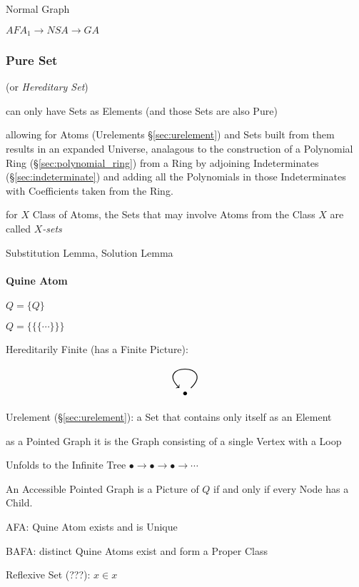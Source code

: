 Normal Graph

$AFA_1 \to NSA \to GA$



\subsubsection{Pure Set}\label{sec:pure_set}

(or \emph{Hereditary Set})

can only have Sets as Elements (and those Sets are also Pure)
\cite{aczel88}

allowing for Atoms (Urelements \S\ref{sec:urelement}) and Sets built
from them results in an expanded Universe, analagous to the
construction of a Polynomial Ring (\S\ref{sec:polynomial_ring}) from a
Ring by adjoining Indeterminates (\S\ref{sec:indeterminate}) and
adding all the Polynomials in those Indeterminates with Coefficients
taken from the Ring.

for $X$ Class of Atoms, the Sets that may involve Atoms from the Class
$X$ are called \emph{$X$-sets}

Substitution Lemma, Solution Lemma



\paragraph{Quine Atom}\label{sec:quine_atom}\hfill

$Q = \{Q\}$

$Q = \{\{\{\cdots\}\}\}$

Hereditarily Finite (has a Finite Picture):
\[
  \begin{tikzpicture}
    \node (A) {$\bullet$};
    \draw[->,thick,loop] (A) to (A);
  \end{tikzpicture}
\]

Urelement (\S\ref{sec:urelement}): a Set that contains only itself as
an Element

as a Pointed Graph it is the Graph consisting of a single Vertex with
a Loop

Unfolds to the Infinite Tree $\bullet \to \bullet
\to \bullet \to \cdots$

An Accessible Pointed Graph is a Picture of $Q$ if and only if every
Node has a Child. \cite{aczel88}

AFA: Quine Atom exists and is Unique

BAFA: distinct Quine Atoms exist and form a Proper Class

Reflexive Set (???): $x \in x$



